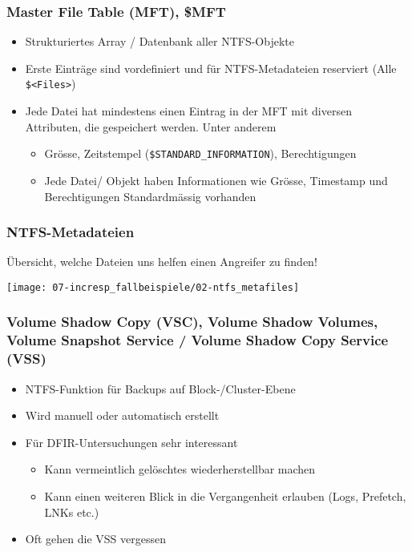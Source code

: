 \subsubsection{Master File Table (MFT), \$MFT}
\begin{itemize}
    \item Strukturiertes Array / \glqq Datenbank\grqq{} aller NTFS-Objekte
    \item Erste Einträge sind vordefiniert und für NTFS-Metadateien reserviert (Alle \lstinline|$<Files>|)
    \item Jede Datei hat mindestens einen Eintrag in der MFT mit diversen Attributen, die gespeichert werden. Unter anderem
    \begin{itemize}
        \item Grösse, Zeitstempel (\lstinline|$STANDARD_INFORMATION|), Berechtigungen
        \item Jede Datei/ Objekt haben Informationen wie Grösse, Timestamp und Berechtigungen Standardmässig vorhanden
    \end{itemize}
\end{itemize}

\subsubsection{NTFS-Metadateien}
Übersicht, welche Dateien uns helfen einen Angreifer zu finden!
\begin{center}
    \texttt{[image: 07-incresp\_fallbeispiele/02-ntfs\_metafiles]}
\end{center}

\subsubsection{Volume Shadow Copy (VSC), Volume Shadow Volumes, Volume Snapshot Service / Volume Shadow Copy Service (VSS)}
\begin{itemize}
    \item NTFS-Funktion für Backups auf Block-/Cluster-Ebene
    \item Wird manuell oder automatisch erstellt
    \item Für DFIR-Untersuchungen sehr interessant
    \begin{itemize}
        \item Kann vermeintlich gelöschtes wiederherstellbar machen
        \item Kann einen weiteren Blick in die Vergangenheit erlauben (Logs, Prefetch, LNKs etc.)
    \end{itemize}
    \item Oft gehen die VSS vergessen
\end{itemize}

